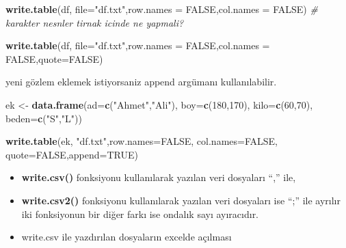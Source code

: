 \documentclass[
  oneside]{book}
\newenvironment{Shaded}{\begin{snugshade}}{\end{snugshade}}
\newcommand{\AttributeTok}[1]{\textcolor[rgb]{0.13,0.29,0.53}{#1}}
\newcommand{\CommentTok}[1]{\textcolor[rgb]{0.56,0.35,0.01}{\textit{#1}}}
\newcommand{\ConstantTok}[1]{\textcolor[rgb]{0.56,0.35,0.01}{#1}}
\newcommand{\DecValTok}[1]{\textcolor[rgb]{0.00,0.00,0.81}{#1}}
\newcommand{\FunctionTok}[1]{\textcolor[rgb]{0.13,0.29,0.53}{\textbf{#1}}}
\newcommand{\NormalTok}[1]{#1}
\newcommand{\OtherTok}[1]{\textcolor[rgb]{0.56,0.35,0.01}{#1}}
\newcommand{\StringTok}[1]{\textcolor[rgb]{0.31,0.60,0.02}{#1}}
\begin{document}
\begin{Shaded}
\begin{Highlighting}[]
\FunctionTok{write.table}\NormalTok{(df, }\AttributeTok{file=}\StringTok{"df.txt"}\NormalTok{,}\AttributeTok{row.names =} \ConstantTok{FALSE}\NormalTok{,}\AttributeTok{col.names =} \ConstantTok{FALSE}\NormalTok{)}
\CommentTok{\# karakter nesnler tirnak icinde ne yapmali?}
\end{Highlighting}
\end{Shaded}

\begin{Shaded}
\begin{Highlighting}[]
\FunctionTok{write.table}\NormalTok{(df, }\AttributeTok{file=}\StringTok{"df.txt"}\NormalTok{,}\AttributeTok{row.names =} \ConstantTok{FALSE}\NormalTok{,}\AttributeTok{col.names =} \ConstantTok{FALSE}\NormalTok{,}\AttributeTok{quote=}\ConstantTok{FALSE}\NormalTok{)}
\end{Highlighting}
\end{Shaded}

yeni gözlem eklemek istiyorsaniz append argümanı kullanılabilir.

\begin{Shaded}
\begin{Highlighting}[]
\NormalTok{ ek }\OtherTok{\textless{}{-}} \FunctionTok{data.frame}\NormalTok{(}\AttributeTok{ad=}\FunctionTok{c}\NormalTok{(}\StringTok{"Ahmet"}\NormalTok{,}\StringTok{"Ali"}\NormalTok{), }\AttributeTok{boy=}\FunctionTok{c}\NormalTok{(}\DecValTok{180}\NormalTok{,}\DecValTok{170}\NormalTok{), }\AttributeTok{kilo=}\FunctionTok{c}\NormalTok{(}\DecValTok{60}\NormalTok{,}\DecValTok{70}\NormalTok{), }
                 \AttributeTok{beden=}\FunctionTok{c}\NormalTok{(}\StringTok{"S"}\NormalTok{,}\StringTok{"L"}\NormalTok{))}
\end{Highlighting}
\end{Shaded}

\begin{Shaded}
\begin{Highlighting}[]
\FunctionTok{write.table}\NormalTok{(ek, }\StringTok{"df.txt"}\NormalTok{,}\AttributeTok{row.names=}\ConstantTok{FALSE}\NormalTok{,}
            \AttributeTok{col.names=}\ConstantTok{FALSE}\NormalTok{,}
            \AttributeTok{quote=}\ConstantTok{FALSE}\NormalTok{,}\AttributeTok{append=}\ConstantTok{TRUE}\NormalTok{)}
\end{Highlighting}
\end{Shaded}

\begin{itemize}
\item
  \textbf{write.csv()} fonksiyonu kullanılarak yazılan veri dosyaları ``,'' ile,
\item
  \textbf{write.csv2()} fonksiyonu kullanılarak yazılan veri dosyaları ise ``;'' ile ayrılır iki fonksiyonun bir diğer farkı ise ondalık sayı ayıracıdır.
\item
  write.csv ile yazdırılan dosyaların excelde açılması
\end{itemize}
\end{document}
